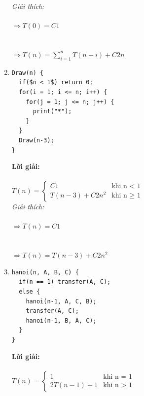 \documentclass[12pt, letterpaper]{article}
\begin{document}
\begin{enumerate}
	      \textit{Giải thích:} \\
	       \\
	      $\Rightarrow T(0) = C1$ \\
	       \\
	       \\
	      $\Rightarrow T(n) = \sum_{i=1}^{n} T(n-i) + C2n$ \\


	\item \begin{lstlisting}
Draw(n) {
  if($n < 1$) return 0;
  for(i = 1; i <= n; i++) {
    for(j = 1; j <= n; j++) {
      print("*");
    }
  }
  Draw(n-3);
}
	\end{lstlisting}
	      \textbf{Lời giải:} \\ \\
	      $T(n) =
		      \begin{cases}
			      C1             & \text{khi n < 1}      \\
			      T(n-3) + C2n^2 & \text{khi n $\geq$ 1}
		      \end{cases}$ \\

	      \textit{Giải thích:} \\
	       \\
	      $\Rightarrow T(n) = C1$ \\
	       \\
	       \\
	      $\Rightarrow T(n) = T(n-3) + C2n^2$ \\

	\item \begin{lstlisting}
hanoi(n, A, B, C) {
  if(n == 1) transfer(A, C);
  else {
    hanoi(n-1, A, C, B);
    transfer(A, C);
    hanoi(n-1, B, A, C);
  }
}
  \end{lstlisting}

	      \textbf{Lời giải:} \\ \\
	      $T(n) =
		      \begin{cases}
			      1           & \text{khi n = 1} \\
			      2T(n-1) + 1 & \text{khi n > 1}
		      \end{cases}$ \\


\end{enumerate}
\end{document}
